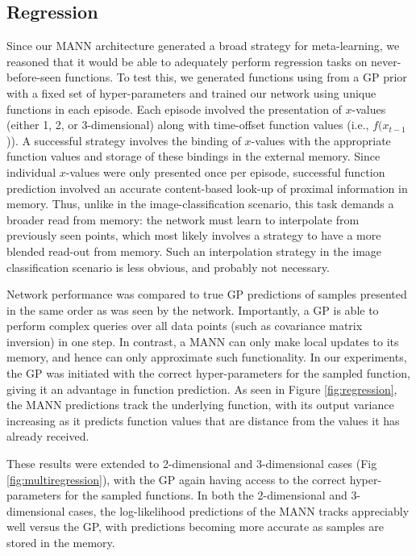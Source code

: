 \documentclass{article}
\begin{document}
\subsection{Regression}
Since our MANN architecture generated a broad strategy for meta-learning, we reasoned that it would be able to adequately perform regression tasks on never-before-seen functions. To test this, we generated functions using from a GP prior with a fixed set of hyper-parameters and trained our network using unique functions in each episode. Each episode involved the presentation of $x$-values (either 1, 2, or 3-dimensional) along with time-offset function values (i.e., $f(x_{t-1}$)). A successful strategy involves the binding of $x$-values with the appropriate function values and storage of these bindings in the external memory. Since individual $x$-values were only presented once per episode, successful function prediction involved an accurate content-based look-up of proximal information in memory. Thus, unlike in the image-classification scenario, this task demands a broader read from memory: the network must learn to interpolate from previously seen points, which most likely involves a strategy to have a more blended read-out from memory. Such an interpolation strategy in the image classification scenario is less obvious, and probably not necessary. 

Network performance was compared to true GP predictions of samples presented in the same order as was seen by the network. Importantly, a GP is able to perform complex queries over all data points (such as covariance matrix inversion) in one step. In contrast, a MANN can only make local updates to its memory, and hence can only approximate such functionality. In our experiments, the GP was initiated with the correct hyper-parameters for the sampled function, giving it an advantage in function prediction. As seen in Figure \ref{fig:regression}, the MANN predictions track the underlying function, with its output variance increasing as it predicts function values that are distance from the values it has already received.

These results were extended to 2-dimensional and 3-dimensional cases  (Fig \ref{fig:multiregression}), with the GP again having access to the correct hyper-parameters for the sampled functions. In both the 2-dimensional and 3-dimensional cases, the log-likelihood predictions of the MANN tracks appreciably well versus the GP, with predictions becoming more accurate as samples are stored in the memory.  
\end{document}
